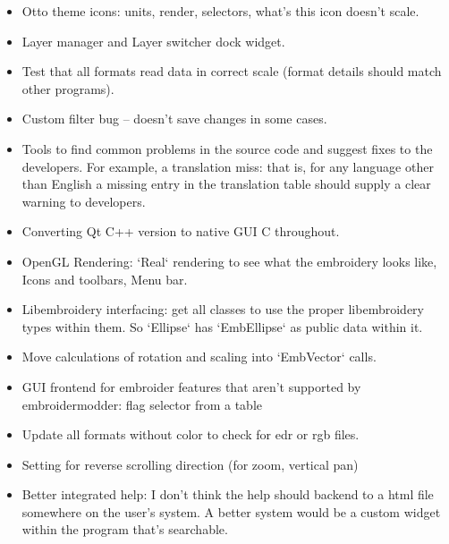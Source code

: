 \documentclass[10pt]{report}
\begin{document}
\begin{itemize}
\item Otto theme icons: units, render, selectors, what's this icon doesn't scale.
\item Layer manager and Layer switcher dock widget.
\item Test that all formats read data in correct scale (format details should match other programs).
\item Custom filter bug -- doesn't save changes in some cases.
\item Tools to find common problems in the source code and suggest fixes to the developers. For example, a translation miss: that is, for any language other than English a missing entry in the translation table should supply a clear warning to developers.
\item Converting Qt C++ version to native GUI C throughout.
\item OpenGL Rendering: `Real` rendering to see what the embroidery looks like, Icons and toolbars, Menu bar.
\item Libembroidery interfacing: get all classes to use the proper libembroidery types within them. So `Ellipse` has `EmbEllipse` as public data within it.
\item Move calculations of rotation and scaling into `EmbVector` calls.
\item GUI frontend for embroider features that aren't supported by embroidermodder: flag selector from a table
\item Update all formats without color to check for edr or rgb files.
\item Setting for reverse scrolling direction (for zoom, vertical pan)
\item Better integrated help: I don't think the help should backend to a html file somewhere on the user's system. A better system would be a custom widget within the program that's searchable.
\end{itemize}
\end{document}
